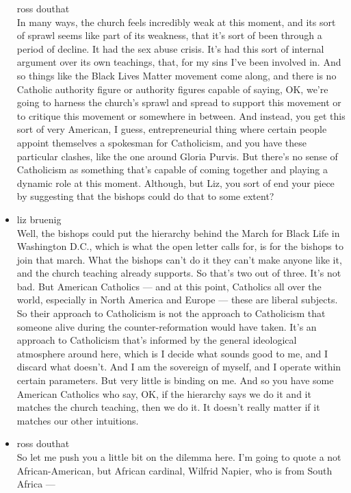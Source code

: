 \begin{itemize}
  ross douthat\\
  In many ways, the church feels incredibly weak at this moment, and its
  sort of sprawl seems like part of its weakness, that it's sort of been
  through a period of decline. It had the sex abuse crisis. It's had
  this sort of internal argument over its own teachings, that, for my
  sins I've been involved in. And so things like the Black Lives Matter
  movement come along, and there is no Catholic authority figure or
  authority figures capable of saying, OK, we're going to harness the
  church's sprawl and spread to support this movement or to critique
  this movement or somewhere in between. And instead, you get this sort
  of very American, I guess, entrepreneurial thing where certain people
  appoint themselves a spokesman for Catholicism, and you have these
  particular clashes, like the one around Gloria Purvis. But there's no
  sense of Catholicism as something that's capable of coming together
  and playing a dynamic role at this moment. Although, but Liz, you sort
  of end your piece by suggesting that the bishops could do that to some
  extent?
\item
  liz bruenig\\
  Well, the bishops could put the hierarchy behind the March for Black
  Life in Washington D.C., which is what the open letter calls for, is
  for the bishops to join that march. What the bishops can't do it they
  can't make anyone like it, and the church teaching already supports.
  So that's two out of three. It's not bad. But American Catholics ---
  and at this point, Catholics all over the world, especially in North
  America and Europe --- these are liberal subjects. So their approach
  to Catholicism is not the approach to Catholicism that someone alive
  during the counter-reformation would have taken. It's an approach to
  Catholicism that's informed by the general ideological atmosphere
  around here, which is I decide what sounds good to me, and I discard
  what doesn't. And I am the sovereign of myself, and I operate within
  certain parameters. But very little is binding on me. And so you have
  some American Catholics who say, OK, if the hierarchy says we do it
  and it matches the church teaching, then we do it. It doesn't really
  matter if it matches our other intuitions.
\item
  ross douthat\\
  So let me push you a little bit on the dilemma here. I'm going to
  quote a not African-American, but African cardinal, Wilfrid Napier,
  who is from South Africa ---

\end{itemize}
